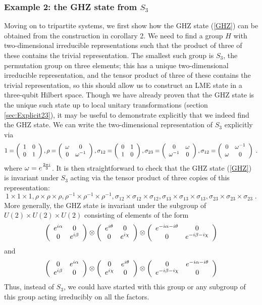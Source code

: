 \documentclass[12pt]{article}
\theoremstyle{definition}
\newcommand{\be}{\begin{equation}}
\newcommand{\ee}{\end{equation}}
\newcommand{\ba}{\begin{array}}
\newcommand{\ea}{\end{array}}
\begin{document}
\subsubsection*{Example 2: the GHZ state from $S_3$}

Moving on to tripartite systems, we first show how the GHZ state (\ref{GHZ}) can be obtained from the construction in corollary 2. We need to find a group $H$ with two-dimensional irreducible representations such that the product of three of these contains the trivial representation. The smallest such group is $S_3$, the permutation group on three elements; this has a unique two-dimensional irreducible representation, and the tensor product of three of these contains the trivial representation, so this should allow us to construct an LME state in a three-qubit Hilbert space. Though we have already proven that the GHZ state is the unique such state up to local unitary transformations (section \ref{sec:Explicit23}), it may be useful to demonstrate explicitly that we indeed find the GHZ state. We can write the two-dimensional representation of $S_3$ explicitly via
\be
\label{S3rep}
1 = \left( \ba{cc} 1 & 0  \cr 0 & 1 \ea \right), \rho = \left( \ba{cc} \omega & 0  \cr 0 & \omega^{-1} \ea \right), \sigma_{12} = \left( \ba{cc} 0 & 1  \cr 1 & 0 \ea \right), \sigma_{23} = \left( \ba{cc} 0 & \omega  \cr \omega^{-1} & 0 \ea \right), \sigma_{12} = \left( \ba{cc} 0 & \omega^{-1}  \cr \omega & 0 \ea \right) \; .
\ee
where $\omega = e^{2 \pi i \over 3}$. It is then straightforward to check that the GHZ state (\ref{GHZ}) is invariant under $S_3$ acting via the tensor product of three copies of this representation:
\be
1 \times 1 \times 1, \rho \times \rho \times \rho, \rho^{-1} \times \rho^{-1} \times \rho^{-1}, \sigma_{12} \times \sigma_{12} \times \sigma_{12}, \sigma_{13} \times \sigma_{13} \times \sigma_{13},\sigma_{23} \times \sigma_{23} \times \sigma_{23}\; .
\ee
More generally, the GHZ state is invariant under the subgroup of $U(2) \times U(2) \times U(2)$ consisting of elements of the form
\be
\left( \ba{cc} e^{i \alpha} & 0 \cr 0 & e^{i \beta} \ea \right) \otimes \left( \ba{cc} e^{i \theta} & 0 \cr 0 & e^{i \chi} \ea \right) \otimes \left( \ba{cc} e^{-i \alpha - i \theta} & 0 \cr 0 & e^{-i \beta - i \chi} \ea \right)
\ee
and
\be
\left( \ba{cc} 0 & e^{i \alpha}  \cr e^{i \beta} & 0 \ea \right) \otimes \left( \ba{cc} 0 & e^{i \theta}  \cr e^{i \chi} & 0 \ea \right) \otimes \left( \ba{cc} 0 & e^{-i \alpha - i \theta} \cr  e^{-i \beta - i \chi} & 0 \ea \right)
\ee
Thus, instead of $S_3$, we could have started with this group or any subgroup of this group acting irreducibly on all the factors.
\end{document}
